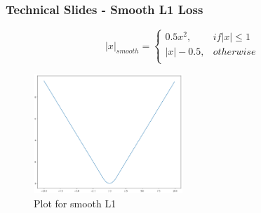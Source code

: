\documentclass{beamer}
\begin{document}
\begin{frame}
\frametitle{Technical Slides - Smooth L1 Loss}
\[
	\lvert x \rvert _{smooth}=
	\begin{cases}
	0.5x^2, & if \lvert x \rvert \leq 1\\
	\lvert x \rvert -0.5, & otherwise\\
	\end{cases}
	\]
\begin{figure}
    \centering
        \includegraphics[width=0.5\textwidth]{l1_smooth.png}
        \caption{Plot for smooth L1}
    \end{figure}
\end{frame}
\end{document}
